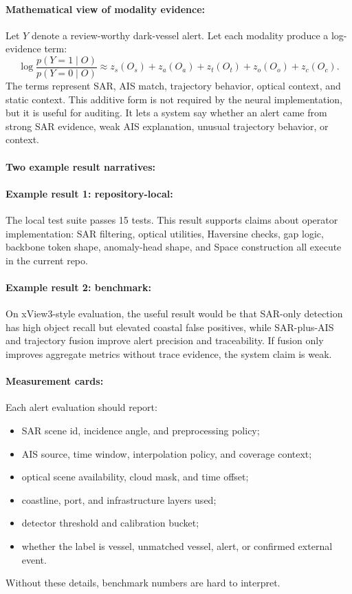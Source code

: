 \documentclass{article}
\begin{document}
\paragraph{Mathematical view of modality evidence:}

Let $Y$ denote a review-worthy dark-vessel alert. Let each modality produce a log-evidence term:
\begin{equation}
  \log\frac{p(Y=1\mid O)}{p(Y=0\mid O)}
  \approx
  z_s(O_s)+z_a(O_a)+z_t(O_t)+z_o(O_o)+z_c(O_c).
\end{equation}
The terms represent SAR, AIS match, trajectory behavior, optical context, and static context. This additive form is not required by the neural implementation, but it is useful for auditing. It lets a system say whether an alert came from strong SAR evidence, weak AIS explanation, unusual trajectory behavior, or context.

\paragraph{Two example result narratives:}

\paragraph{Example result 1: repository-local:}
The local test suite passes 15 tests. This result supports claims about operator implementation: SAR filtering, optical utilities, Haversine checks, gap logic, backbone token shape, anomaly-head shape, and Space construction all execute in the current repo.

\paragraph{Example result 2: benchmark:}
On xView3-style evaluation, the useful result would be that SAR-only detection has high object recall but elevated coastal false positives, while SAR-plus-AIS and trajectory fusion improve alert precision and traceability. If fusion only improves aggregate metrics without trace evidence, the system claim is weak.

\paragraph{Measurement cards:}

Each alert evaluation should report:
\begin{itemize}
  \item SAR scene id, incidence angle, and preprocessing policy;
  \item AIS source, time window, interpolation policy, and coverage context;
  \item optical scene availability, cloud mask, and time offset;
  \item coastline, port, and infrastructure layers used;
  \item detector threshold and calibration bucket;
  \item whether the label is vessel, unmatched vessel, alert, or confirmed external event.
\end{itemize}
Without these details, benchmark numbers are hard to interpret.
\end{document}
